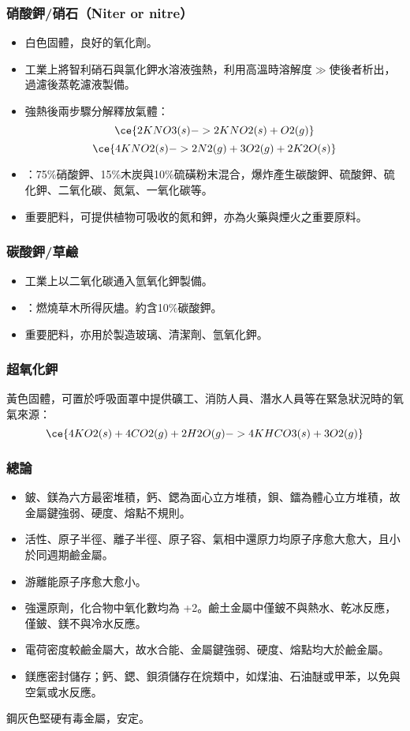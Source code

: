 \documentclass[a4paper,12pt]{report}
\begin{document}
\begin{itemize}
\begin{itemize}
\subsubsection{硝酸鉀/硝石（Niter or nitre）}
\begin{itemize}
\item 白色固體，良好的氧化劑。
\item 工業上將智利硝石與氯化鉀水溶液強熱，利用高溫時溶解度$\gg$使後者析出，過濾後蒸乾濾液製備。
\item 強熱後兩步驟分解釋放氣體：
\[\ce{2KNO3(s) -> 2KNO2(s) + O2(g)}\]
\[\ce{4KNO2(s) -> 2N2(g) + 3O2(g) + 2K2O(s)}\]
\item {}：75\%硝酸鉀、15\%木炭與10\%硫磺粉末混合，爆炸產生碳酸鉀、硫酸鉀、硫化鉀、二氧化碳、氮氣、一氧化碳等。
\item 重要肥料，可提供植物可吸收的氮和鉀，亦為火藥與煙火之重要原料。
\end{itemize}
\subsubsection{碳酸鉀/草鹼}
\begin{itemize}
\item 工業上以二氧化碳通入氫氧化鉀製備。
\item {}：燃燒草木所得灰燼。約含10\%碳酸鉀。
\item 重要肥料，亦用於製造玻璃、清潔劑、氫氧化鉀。
\end{itemize}
\subsubsection{超氧化鉀}
黃色固體，可置於呼吸面罩中提供礦工、消防人員、潛水人員等在緊急狀況時的氧氣來源：
\[\ce{4KO2(s) + 4CO2(g) + 2H2O(g) -> 4KHCO3(s) + 3O2(g)}\]
\subsubsection{總論}
\begin{itemize}
\item 鈹、鎂為六方最密堆積，鈣、鍶為面心立方堆積，鋇、鐳為體心立方堆積，故金屬鍵強弱、硬度、熔點不規則。
\item 活性、原子半徑、離子半徑、原子容、氣相中還原力均原子序愈大愈大，且小於同週期鹼金屬。
\item 游離能原子序愈大愈小。
\item 強還原劑，化合物中氧化數均為 +2。鹼土金屬中僅鈹不與熱水、乾冰反應，僅鈹、鎂不與冷水反應。
\item 電荷密度較鹼金屬大，故水合能、金屬鍵強弱、硬度、熔點均大於鹼金屬。
\item 鎂應密封儲存；鈣、鍶、鋇須儲存在烷類中，如煤油、石油醚或甲苯，以免與空氣或水反應。
\end{itemize}
鋼灰色堅硬有毒金屬，安定。

\end{itemize}
\end{itemize}
\end{document}
